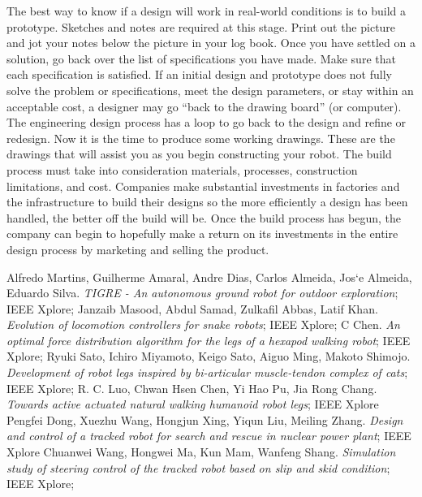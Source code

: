 \documentclass{romjist}
\begin{document}
The best way to know if a design will work in real-world conditions is to build a prototype. Sketches and notes are required at this stage. Print out the picture and jot your notes below the picture in your log book. Once you have settled on a solution, go back over the list of specifications you have made. Make sure that each specification is satisfied. If an initial design and prototype does not fully solve the problem or specifications, meet the design parameters, or stay within an acceptable cost, a designer may go “back to the drawing board” (or computer). The engineering design process has a loop to go back to the design and refine or redesign. Now it is the time to produce some working drawings. These are the drawings that will assist you as you begin constructing your robot. The build process must take into consideration materials, processes, construction limitations, and cost. Companies make substantial investments in factories and the infrastructure to build their designs so the more efficiently a design has been handled, the better off the build will be. Once the build process has begun, the company can begin to hopefully make a return on its investments in the entire design process by marketing and selling the product.



\begin{thebibliography}{24}
	Alfredo Martins, Guilherme Amaral, Andre Dias, Carlos Almeida, Jos`e Almeida, Eduardo Silva. \textit{TIGRE - An autonomous ground robot for outdoor exploration}; IEEE Xplore; 
   Janzaib Masood, Abdul Samad, Zulkafil Abbas, Latif Khan. \textit{Evolution of locomotion controllers for snake robots}; IEEE Xplore;
	C Chen. \textit{An optimal force distribution algorithm for the legs of a hexapod walking robot}; IEEE Xplore; 
	Ryuki Sato, Ichiro Miyamoto, Keigo Sato, Aiguo Ming, Makoto Shimojo. \textit{Development of robot legs inspired by bi-articular muscle-tendon complex of cats}; IEEE Xplore; 
	R. C. Luo, Chwan Hsen Chen, Yi Hao Pu, Jia Rong Chang. \textit{Towards active actuated natural walking humanoid robot legs}; IEEE Xplore
	Pengfei Dong, Xuezhu Wang, Hongjun Xing, Yiqun Liu, Meiling Zhang. \textit{Design and control of a tracked robot for search and rescue in nuclear power plant}; IEEE Xplore
	Chuanwei Wang, Hongwei Ma, Kun Mam, Wanfeng Shang. \textit{Simulation study of steering control of the tracked robot based on slip and skid condition}; IEEE Xplore;
\end{thebibliography}
\end{document}
